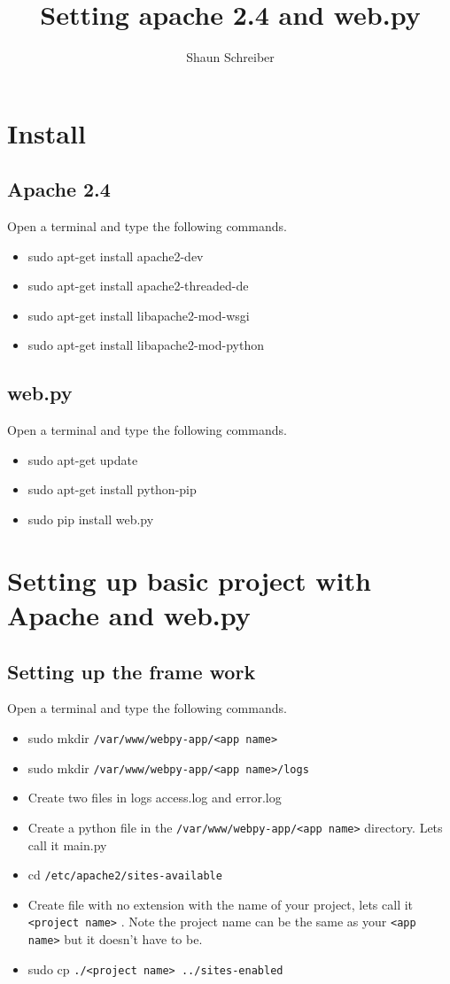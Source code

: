 \documentclass[a4paper]{article}
\author{Shaun Schreiber}
\title{Setting apache 2.4 and web.py}
\begin{document}
\maketitle
\section{Install}
\subsection{Apache 2.4}
Open a terminal and type the following commands.
\begin{itemize}
\item sudo apt-get install apache2-dev
\item sudo apt-get install apache2-threaded-de
\item sudo apt-get install libapache2-mod-wsgi
\item sudo apt-get install libapache2-mod-python
\end{itemize}
\subsection{web.py}
Open a terminal and type the following commands.
\begin{itemize}
\item sudo apt-get update
\item sudo apt-get install python-pip
\item sudo pip install web.py
\end{itemize}
\section{Setting up basic project with Apache and web.py}
\subsection{Setting up the frame work}
Open a terminal and type the following commands.
\begin{itemize}
\item sudo mkdir \verb#/var/www/webpy-app/<app name>#
\item sudo mkdir \verb#/var/www/webpy-app/<app name>/logs#
\item Create two files in logs access.log and error.log
\item Create a python file in the \verb#/var/www/webpy-app/<app name># directory. Lets call it main.py
\item cd \verb#/etc/apache2/sites-available#
\item Create file with no extension with the name of your project, lets call it \verb#<project name># . Note the project name can be the same as your \verb#<app name># but it doesn't have to be.
\item sudo cp \verb#./<project name> ../sites-enabled#
\end{itemize}
\end{document}
